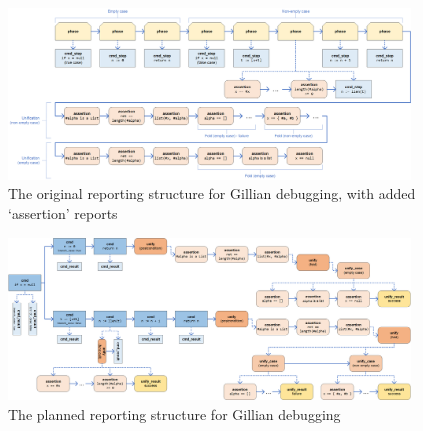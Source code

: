 
\begin{figure}
  \center{}
  \includegraphics[width=0.95\textwidth]{img/log-structure-current.png}
  \caption{The original reporting structure for Gillian debugging, with added `assertion' reports}\label{fig:log-structure-current}
\end{figure}

\begin{figure}
  \center{}
  \includegraphics[width=0.95\textwidth]{img/log-structure-desired.png}
  \caption{The planned reporting structure for Gillian debugging}\label{fig:log-structure-desired}
\end{figure}

\restoregeometry{}
